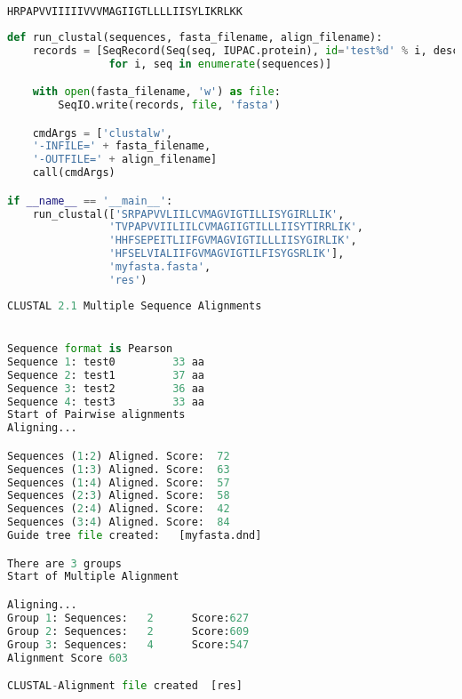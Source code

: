 \documentclass{report}
\begin{document}
\begin{lstlisting}[language=Python, caption={Результат работы}]
HRPAPVVIIIIIVVVMAGIIGTLLLLIISYLIKRLKK
\end{lstlisting}


\begin{lstlisting}[language=Python, caption={Запуск clustal}]
def run_clustal(sequences, fasta_filename, align_filename):
	records = [SeqRecord(Seq(seq, IUPAC.protein), id='test%d' % i, description='my_desc')
				for i, seq in enumerate(sequences)]

	with open(fasta_filename, 'w') as file:
		SeqIO.write(records, file, 'fasta')

	cmdArgs = ['clustalw',
	'-INFILE=' + fasta_filename,
	'-OUTFILE=' + align_filename]
	call(cmdArgs)

if __name__ == '__main__':
	run_clustal(['SRPAPVVLIILCVMAGVIGTILLISYGIRLLIK',
				'TVPAPVVIILIILCVMAGIIGTILLLIISYTIRRLIK',
				'HHFSEPEITLIIFGVMAGVIGTILLLIISYGIRLIK',
				'HFSELVIALIIFGVMAGVIGTILFISYGSRLIK'],
				'myfasta.fasta',
				'res')
\end{lstlisting}


\begin{lstlisting}[language=Python, caption={Результат работы}]
 CLUSTAL 2.1 Multiple Sequence Alignments


Sequence format is Pearson
Sequence 1: test0         33 aa
Sequence 2: test1         37 aa
Sequence 3: test2         36 aa
Sequence 4: test3         33 aa
Start of Pairwise alignments
Aligning...

Sequences (1:2) Aligned. Score:  72
Sequences (1:3) Aligned. Score:  63
Sequences (1:4) Aligned. Score:  57
Sequences (2:3) Aligned. Score:  58
Sequences (2:4) Aligned. Score:  42
Sequences (3:4) Aligned. Score:  84
Guide tree file created:   [myfasta.dnd]

There are 3 groups
Start of Multiple Alignment

Aligning...
Group 1: Sequences:   2      Score:627
Group 2: Sequences:   2      Score:609
Group 3: Sequences:   4      Score:547
Alignment Score 603

CLUSTAL-Alignment file created  [res]
\end{lstlisting}
\end{document}
